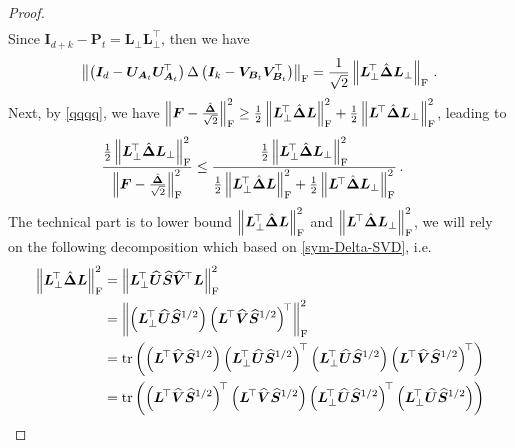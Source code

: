 \begin{proof}
\begin{align}
\end{align}
Since $\bm I_{d+k}-\mathbf{P}_t=\bm L_\perp\bm L_\perp^{\!\top}$, then we have
\begin{align}\label{eq:iudiv}
    \left\|\left(\bm I_d - \bm U_{\bm A_t} \bm U_{\bm A_t}^{\!\top}\right)\Delta\left(\bm I_k - \bm V_{\bm B_t} \bm V_{\bm B_t}^{\!\top}\right)\right\|_{\rm F} = \frac{1}{\sqrt{2}}\left\|\bm L_\perp^{\!\top}\hat{\bm \Delta}\bm L_\perp\right\|_{\rm F}\,.
\end{align}
Next, by \cref{qqqq}, we have $\left\|\bm F - \frac{\hat{\bm \Delta}}{\sqrt{2}}\right\|^2_{\rm F} \geq \frac{1}{2}\left\|\bm L_\perp^{\!\top}\hat{\bm \Delta}\bm L\right\|^2_{\rm F} + \frac{1}{2}\left\|\bm L^{\!\top}\hat{\bm \Delta}\bm L_\perp\right\|^2_{\rm F}$, leading to
\begin{align}
    \frac{\frac{1}{2}\left\|\bm L_\perp^{\!\top}\hat{\bm \Delta}\bm L_\perp\right\|^2_{\rm F}}{\left\|\bm F - \frac{\hat{\bm \Delta}}{\sqrt{2}}\right\|^2_{\rm F}} & \leq \frac{\frac{1}{2}\left\|\bm L_\perp^{\!\top}\hat{\bm \Delta}\bm L_\perp\right\|^2_{\rm F}}{\frac{1}{2}\left\|\bm L_\perp^{\!\top}\hat{\bm \Delta}\bm L\right\|^2_{\rm F} + \frac{1}{2}\left\|\bm L^{\!\top}\hat{\bm \Delta}\bm L_\perp\right\|^2_{\rm F}} \label{eq:fldelta}\,.
\end{align}
The technical part is to lower bound $\left\|\bm L_\perp^{\!\top}\hat{\bm \Delta}\bm L\right\|^2_{\rm F}$ and $\left\|\bm L^{\!\top}\hat{\bm \Delta}\bm L_\perp\right\|^2_{\rm F}$, we will rely on the following decomposition which based on \cref{sym-Delta-SVD}, i.e.
\begin{align*}
    \left\|\bm L_\perp^{\!\top}\hat{\bm \Delta}\bm L\right\|^2_{\rm F} & = \left\|\bm L_\perp^{\!\top}\widehat{\bm U}\widehat{\bm S} \widehat{\bm V}^{\!\top}\bm L\right\|^2_{\rm F}\\
    & = \left\|\left(\bm L_\perp^{\!\top}\widehat{\bm U}\widehat{\bm S}^{1/2}\right)\left(\bm L^{\!\top} \widehat{\bm V}\widehat{\bm S}^{1/2}\right)^{\!\top}\right\|^2_{\rm F}\\
    & = \operatorname{tr}\left(\left(\bm L^{\!\top} \widehat{\bm V}\widehat{\bm S}^{1/2}\right)\left(\bm L_\perp^{\!\top}\widehat{\bm U}\widehat{\bm S}^{1/2}\right)^{\!\top}\left(\bm L_\perp^{\!\top}\widehat{\bm U}\widehat{\bm S}^{1/2}\right)\left(\bm L^{\!\top} \widehat{\bm V}\widehat{\bm S}^{1/2}\right)^{\!\top}\right)\\
    & = \operatorname{tr}\left(\left(\bm L^{\!\top} \widehat{\bm V}\widehat{\bm S}^{1/2}\right)^{\!\top}\left(\bm L^{\!\top} \widehat{\bm V}\widehat{\bm S}^{1/2}\right)\left(\bm L_\perp^{\!\top}\widehat{\bm U}\widehat{\bm S}^{1/2}\right)^{\!\top}\left(\bm L_\perp^{\!\top}\widehat{\bm U}\widehat{\bm S}^{1/2}\right)\right)\\

\end{align*}
\end{proof}
